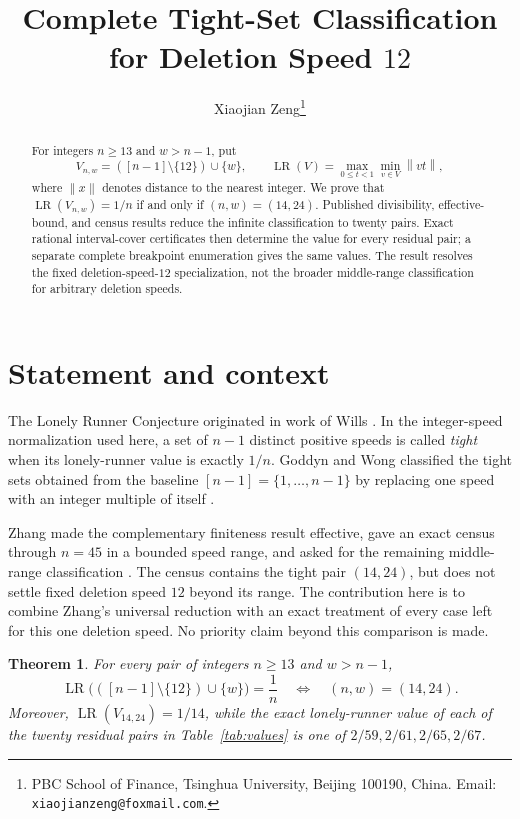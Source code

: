 \documentclass[11pt]{article}
\title{Complete Tight-Set Classification for Deletion Speed \(12\)}
\author{Xiaojian Zeng\thanks{PBC School of Finance, Tsinghua University,
Beijing 100190, China. Email: \texttt{xiaojianzeng@foxmail.com}.}}
\date{}
\newtheorem{theorem}{Theorem}
\newcommand{\dist}[1]{\left\lVert #1\right\rVert}
\newcommand{\LR}{\operatorname{LR}}
\begin{document}
\maketitle

\begin{abstract}
For integers \(n\geq 13\) and \(w>n-1\), put
\[
 V_{n,w}=([n-1]\setminus\{12\})\cup\{w\},\qquad
 \LR(V)=\max_{0\leq t<1}\min_{v\in V}\dist{vt},
\]
where \(\dist{x}\) denotes distance to the nearest integer.  We prove that
\(\LR(V_{n,w})=1/n\) if and only if \((n,w)=(14,24)\).  Published
divisibility, effective-bound, and census results reduce the infinite
classification to twenty pairs.  Exact rational interval-cover certificates
then determine the value for every residual pair; a separate complete
breakpoint enumeration gives the same values.  The result resolves the fixed
deletion-speed-\(12\) specialization, not the broader middle-range
classification for arbitrary deletion speeds.
\end{abstract}

\section{Statement and context}

The Lonely Runner Conjecture originated in work of Wills
\cite{Wills1967}.  In the integer-speed normalization used here, a set of
\(n-1\) distinct positive speeds is called \emph{tight} when its lonely-runner
value is exactly \(1/n\).  Goddyn and Wong classified the tight sets obtained
from the baseline \([n-1]=\{1,\ldots,n-1\}\) by replacing one speed with an
integer multiple of itself \cite{GoddynWong2006}.

Zhang made the complementary finiteness result effective, gave an exact
census through \(n=45\) in a bounded speed range, and asked for the remaining
middle-range classification \cite{Zhang2026}.  The census contains the tight
pair \((14,24)\), but does not settle fixed deletion speed \(12\) beyond its
range.  The contribution here is to combine Zhang's universal reduction with
an exact treatment of every case left for this one deletion speed.  No
priority claim beyond this comparison is made.

\begin{theorem}\label{thm:main}
For every pair of integers \(n\geq13\) and \(w>n-1\),
\[
  \LR\bigl(([n-1]\setminus\{12\})\cup\{w\}\bigr)=\frac1n
  \quad\Longleftrightarrow\quad (n,w)=(14,24).
\]
Moreover, \(\LR(V_{14,24})=1/14\), while the exact lonely-runner value
of each of the twenty residual pairs in Table~\ref{tab:values} is one of
\(2/59,2/61,2/65,2/67\).
\end{theorem}
\end{document}

